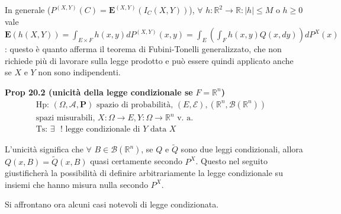\documentclass{article}
\begin{document}
In generale ($P^{\left( X,Y\right) }\left( C\right) =\mathbf{E}^{\left(
X,Y\right) }\left( I_{C}\left( X,Y\right) \right) $), $\forall $ $h:%
\mathbb{R}
^{2}\rightarrow 
\mathbb{R}
:\left\vert h\right\vert \leq M$ o $h\geq 0$ vale $\mathbf{E}\left( h\left(
X,Y\right) \right) =\int_{E\times F}h\left( x,y\right) dP^{\left( X,Y\right)
}\left( x,y\right) =\int_{E}\left( \int_{F}h\left( x,y\right) Q\left(
x,dy\right) \right) dP^{X}\left( x\right) $: questo \`{e} quanto afferma il
teorema di Fubini-Tonelli generalizzato, che non richiede pi\`{u} di
lavorare sulla legge prodotto e pu\`{o} essere quindi applicato anche se $X$
e $Y$ non sono indipendenti.

\textbf{Prop 20.2 (unicit\`{a} della legge condizionale se }$F=%
\mathbb{R}
^{n}$\textbf{)}%
\begin{gather*}
\text{Hp: }\left( \Omega ,\mathcal{A},\mathbf{P}\right) \text{ spazio di
probabilit\`{a}, }\left( E,\mathcal{E}\right) ,\left( 
\mathbb{R}
^{n},\mathcal{B}\left( 
\mathbb{R}
^{n}\right) \right) \text{ } \\
\text{spazi misurabili, }X:\Omega \rightarrow E,Y:\Omega \rightarrow 
\mathbb{R}
^{n}\text{ v. a.} \\
\text{Ts: }\exists \text{ }!\text{ legge condizionale di }Y\text{ data }X
\end{gather*}

L'unicit\`{a} significa che $\forall $ $B\in \mathcal{B}\left( 
\mathbb{R}
^{n}\right) $, se $Q$ e $\tilde{Q}$ sono due leggi condizionali, allora $%
Q\left( x,B\right) =\tilde{Q}\left( x,B\right) $ quasi certamente secondo $%
P^{X}$. Questo nel seguito giustificher\`{a} la possibilit\`{a} di definire
arbitrariamente la legge condizionale su insiemi che hanno misura nulla
secondo $P^{X}$.

Si affrontano ora alcuni casi notevoli di legge condizionata.
\end{document}
